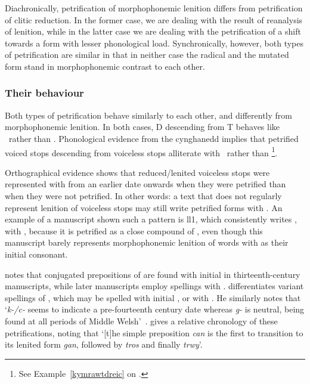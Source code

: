Diachronically, petrification of morphophonemic lenition differs from petrification of clitic reduction. 
In the former case, we are dealing with the result of reanalysis of lenition, while in the latter case we are dealing with the petrification of a shift towards a form with lesser phonological load. 
Synchronically, however, both types of petrification are similar in that in neither case the radical and the mutated form stand in morphophonemic contrast to each other. 

\subsubsection{Their behaviour}
\label{sec:their-behaviour}
Both types of petrification behave similarly to each other, and differently from morphophonemic lenition. 
In both cases, \gls{D} descending from \gls{T} behaves like \xD\ rather than \lT. Phonological evidence from the cynghanedd implies that petrified voiced stops descending from voiceless stops alliterate with \xD\ rather than \lT\footnote{See Example~\ref{kymrawtdreic} on .}.

Orthographical evidence shows that reduced/lenited voiceless stops were represented with  from an earlier date onwards when they were petrified than when they were not petrified. 
In other words: a text that does not regularly represent lenition of voiceless stops may still write petrified forms with . 
An example of a manuscript shown such a pattern is \gls{ll1}, which consistently writes , with , because it is petrified as a close compound of , even though this manuscript barely represents morphophonemic lenition of words with  as their initial consonant.

\Textcite[52]{jongeleen_lenition_2016} notes that conjugated prepositions of  are found with initial   in thirteenth-century manuscripts, while later manuscripts employ spellings with .
\Textcite{sims-williams_variation_2013} differentiates variant spellings of , which may be spelled with initial , or with .
He similarly notes that `\textit{k-/c-} seems to indicate a pre-fourteenth century date whereas \textit{g-} is neutral, being found at all periods of Middle Welsh'~\autocite[24]{sims-williams_variation_2013}. \Textcite[55]{jongeleen_lenition_2016} gives a relative chronology of these petrifications, noting that `[t]he simple preposition \textit{can} is the first to transition to its lenited form \textit{gan}, followed by \textit{tros} and finally \textit{trwy}'.


